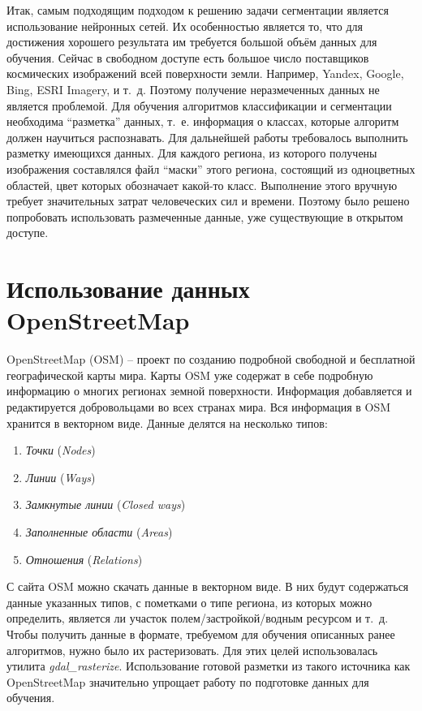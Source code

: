 Итак, самым подходящим подходом к решению задачи сегментации является
использование нейронных сетей. Их особенностью является то, что для достижения
хорошего результата им требуется большой объём данных для обучения. Сейчас в
свободном доступе есть большое число поставщиков космических изображений всей
поверхности земли.  Например, Yandex, Google, Bing, ESRI Imagery, и т. д.
Поэтому получение неразмеченных данных не является проблемой. Для обучения
алгоритмов классификации и сегментации необходима ``разметка'' данных, т. е.
информация о классах, которые алгоритм должен научиться распознавать. Для
дальнейшей работы требовалось выполнить разметку имеющихся данных. Для каждого
региона, из которого получены изображения составлялся файл ``маски'' этого
региона, состоящий из одноцветных областей, цвет которых обозначает какой-то
класс. Выполнение этого вручную требует значительных затрат человеческих сил и
времени. Поэтому было решено попробовать использовать размеченные данные, уже
существующие в открытом доступе.


\section{Использование данных OpenStreetMap}
OpenStreetMap (OSM) – проект по созданию подробной свободной и бесплатной
географической карты мира. Карты OSM уже содержат в себе подробную информацию о
многих регионах земной поверхности. Информация добавляется и редактируется
добровольцами во всех странах мира. Вся информация в OSM хранится в векторном
виде.  Данные делятся на несколько типов:
\begin{enumerate}
    \item \textit{Точки} (\textit{Nodes})
    \item \textit{Линии} (\textit{Ways})
    \item \textit{Замкнутые линии} (\textit{Closed ways})
    \item \textit{Заполненные области} (\textit{Areas})
    \item \textit{Отношения} (\textit{Relations})
\end{enumerate}
С сайта OSM можно скачать данные в векторном виде. В них будут содержаться
данные указанных типов, с пометками о типе региона, из которых можно определить,
является ли участок полем/застройкой/водным ресурсом и т. д.
Чтобы получить данные в формате, требуемом для обучения описанных ранее
алгоритмов, нужно было их растеризовать. Для этих целей использовалась утилита
\textit{gdal\_rasterize}.
Использование готовой разметки из такого источника как OpenStreetMap значительно
упрощает работу по подготовке данных для обучения.

